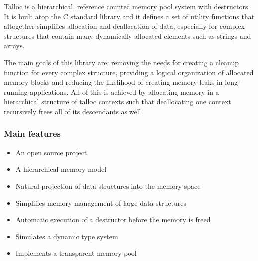 Talloc is a hierarchical, reference counted memory pool system with destructors.
It is built atop the C standard library and it defines a set of utility
functions that altogether simplifies allocation and deallocation of data,
especially for complex structures that contain many dynamically allocated
elements such as strings and arrays.

The main goals of this library are: removing the needs for creating a cleanup
function for every complex structure, providing a logical organization of
allocated memory blocks and reducing the likelihood of creating memory leaks in
long-running applications. All of this is achieved by allocating memory in a
hierarchical structure of talloc contexts such that deallocating one context
recursively frees all of its descendants as well.

\subsubsection{Main features}
\begin{itemize}
  \item An open source project
  \item A hierarchical memory model
  \item Natural projection of data structures into the memory space
  \item Simplifies memory management of large data structures
  \item Automatic execution of a destructor before the memory is freed
  \item Simulates a dynamic type system
  \item Implements a transparent memory pool
\end{itemize}
